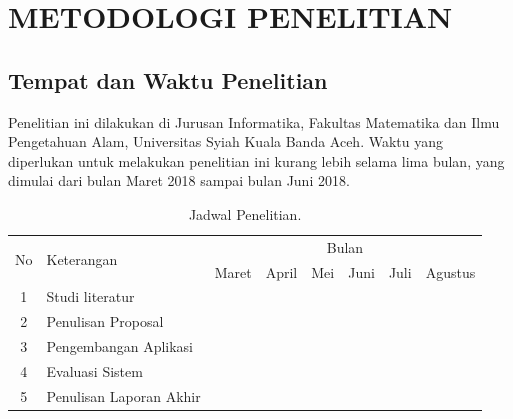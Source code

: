 
\chapter{METODOLOGI PENELITIAN}

\section{Tempat dan Waktu Penelitian}
\setlength\parindent{30pt} Penelitian ini dilakukan di Jurusan Informatika, Fakultas Matematika dan Ilmu Pengetahuan Alam, Universitas Syiah Kuala Banda Aceh. Waktu yang diperlukan untuk melakukan penelitian ini kurang lebih selama lima bulan, yang dimulai dari bulan Maret 2018 sampai bulan Juni 2018.

\begin{table}[H]
	\center
	\caption{Jadwal Penelitian.}
	\label{jadwal}
	\begin{tabular}{|c|l|l|l|l|l|l|l|}
		\hline
		\multirow{2}{*}{No} & \multirow{2}{*}{Keterangan} 	& \multicolumn{6}{c|}{Bulan}           																						\\ \cline{3-8} 
							&                           	& Maret 			& April  			& Mei 				& Juni 				& Juli 				& Agustus 				\\ \hline       
		1                   & Studi literatur           	&\cellcolor{gray}	&\cellcolor{gray}	&                   &                   &                   &                         \\ \hline
		2                   & Penulisan Proposal           	&                   &\cellcolor{gray}	&\cellcolor{gray}	&                   &                   &                         \\ \hline
		3                   & Pengembangan Aplikasi         &                   &                   & \cellcolor{gray}  & \cellcolor{gray} 	& \cellcolor{gray}  &                         \\ \hline
		4                   & Evaluasi Sistem               &                   &                   &           		&             		&\cellcolor{gray}	&   \cellcolor{gray}      \\ \hline
		5                   & Penulisan Laporan Akhir       &                   &                   &                   &        			&      				& \cellcolor{gray}        \\ \hline
	\end{tabular}
\end{table}

